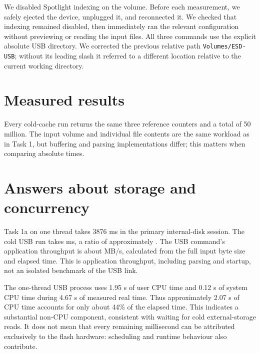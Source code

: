 We disabled Spotlight indexing on the volume. Before each measurement, we safely ejected the device, unplugged it, and reconnected it. We checked that indexing remained disabled, then immediately ran the relevant configuration without previewing or reading the input files. All three commands use the explicit absolute USB directory. We corrected the previous relative path \texttt{Volumes/ESD-USB}; without its leading slash it referred to a different location relative to the current working directory.

\section{Measured results}


Every cold-cache run returns the same three reference counters and a total of 50 million. The input volume and individual file contents are the same workload as in Task 1, but buffering and parsing implementations differ; this matters when comparing absolute times.

\section{Answers about storage and concurrency}
Task 1a on one thread takes 3876 ms in the primary internal-disk session. The cold USB run takes \USBOneMs{} ms, a ratio of approximately \USBvsSSD{}. The USB command's application throughput is about \USBOneMBs{} MB/s, calculated from the full input byte size and elapsed time. This is application throughput, including parsing and startup, not an isolated benchmark of the USB link.

The one-thread USB process uses 1.95 s of user CPU time and 0.12 s of system CPU time during 4.67 s of measured real time. Thus approximately 2.07 s of CPU time accounts for only about 44\% of the elapsed time. This indicates a substantial non-CPU component, consistent with waiting for cold external-storage reads. It does not mean that every remaining millisecond can be attributed exclusively to the flash hardware: scheduling and runtime behaviour also contribute.


